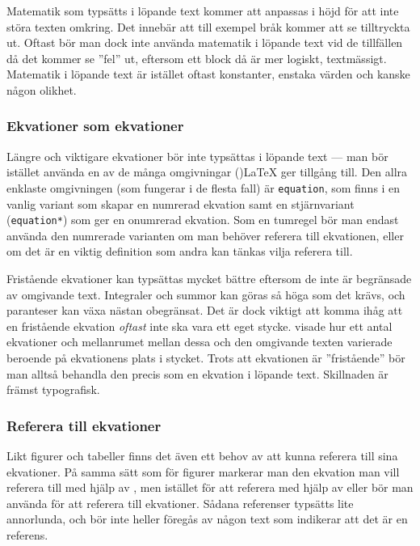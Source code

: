 \documentclass[lang=sv,ptsize=10pt,font=none,nomath,titles=bf,../../a4.tex]{subfiles}
\begin{document}
Matematik som typsätts i löpande text kommer att anpassas i höjd för att
inte störa texten omkring. Det innebär att till exempel bråk kommer att
se tilltryckta ut. Oftast bör man dock inte använda matematik i löpande
text vid de tillfällen då det kommer se ”fel” ut, eftersom ett block då
är mer logiskt, textmässigt. Matematik i löpande text är istället oftast
konstanter, enstaka värden och kanske någon olikhet.

\subsubsection{Ekvationer som ekvationer}\label{sec:3:ekvsomekv}
Längre och viktigare ekvationer bör inte typsättas i löpande text —
man bör istället använda en av de många omgivningar (\AmS)\LaTeX{} ger
tillgång till. Den allra enklaste omgivningen (som fungerar i de flesta
fall) är \texttt{equation}, som finns i en vanlig variant som skapar 
en numrerad ekvation samt en stjärnvariant (\texttt{equation*}) som ger en
onumrerad ekvation. Som en tumregel bör man endast använda den numrerade
varianten om man behöver referera till ekvationen, eller om det är en
viktig definition som andra kan tänkas vilja referera till.

Fristående ekvationer kan typsättas mycket bättre eftersom de inte är 
begränsade av omgivande text. Integraler och summor kan göras så höga som
det krävs, och paranteser kan växa nästan obegränsat. Det är dock viktigt
att komma ihåg att en fristående ekvation \emph{oftast} inte ska vara ett 
eget
stycke.  visade hur ett antal ekvationer och
mellanrumet mellan dessa och den omgivande texten varierade beroende på
	ekvationens plats i stycket. Trots att ekvationen är ”fristående” bör
	man alltså behandla den precis som en
ekvation i löpande text. Skillnaden är främst typografisk.

\subsubsection{Referera till ekvationer}
Likt figurer och tabeller finns det även ett behov av att kunna referera
till sina ekvationer. På samma sätt som för figurer markerar man den
ekvation man vill referera till med hjälp av , men istället
för att referera med hjälp av  eller  bör man använda
 för att referera till ekvationer. Sådana referenser typsätts
lite annorlunda, och bör inte heller föregås av någon text som indikerar
att det är en referens.
\end{document}
